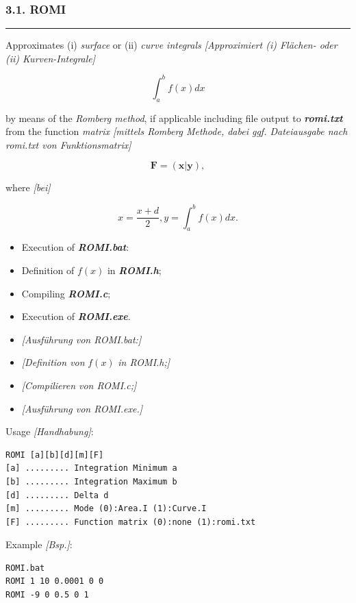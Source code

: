 \documentclass[
]{article}
\begin{document}
\hypertarget{romi}{%
\subsubsection{3.1. ROMI}\label{romi}}

\begin{center}\rule{0.5\linewidth}{0.5pt}\end{center}

Approximates (i) \emph{surface} or (ii) \emph{curve integrals
{[}Approximiert (i) Flächen- oder (ii) Kurven-Integrale{]}}

\[\int_{a}^{b}f(x)dx\]

by means of the \emph{Romberg method}, if applicable including file
output to \textbf{\emph{romi.txt}} from the function \emph{matrix
{[}mittels Romberg Methode, dabei ggf. Dateiausgabe nach romi.txt von
Funktionsmatrix{]}}

\[\mathbf{F =}\left( \mathbf{x|y} \right),\]

where \emph{{[}bei{]}}

\[x = \frac{x + d}{2},y = \int_{a}^{b}{f(x)dx}.\]

\begin{itemize}
\item
  Execution of \textbf{\emph{ROMI.bat}}:
\item
  Definition of \(f(x)\) in \textbf{\emph{ROMI.h}};
\item
  Compiling \textbf{\emph{ROMI.c}};
\item
  Execution of \textbf{\emph{ROMI.exe}}.
\item
  \emph{{[}Ausführung von ROMI.bat:{]}}
\item
  \emph{{[}Definition von} \(f(x)\) \emph{in ROMI.h;{]}}
\item
  \emph{{[}Compilieren von ROMI.c;{]}}
\item
  \emph{{[}Ausführung von ROMI.exe.{]}}
\end{itemize}

Usage \emph{{[}Handhabung{]}}:

\begin{verbatim}
ROMI [a][b][d][m][F]
[a] ......... Integration Minimum a
[b] ......... Integration Maximum b
[d] ......... Delta d
[m] ......... Mode (0):Area.I (1):Curve.I
[F] ......... Function matrix (0):none (1):romi.txt
\end{verbatim}

Example \emph{{[}Bsp.{]}}:

\begin{verbatim}
ROMI.bat
ROMI 1 10 0.0001 0 0
ROMI -9 0 0.5 0 1
\end{verbatim}
\end{document}
